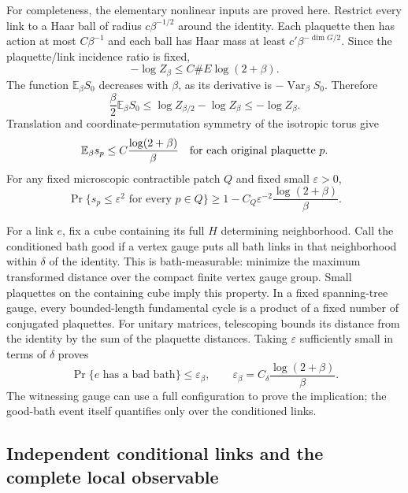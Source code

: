\documentclass[11pt,letterpaper]{article}
\numberwithin{equation}{section}
\theoremstyle{plain}
\theoremstyle{remark}
\DeclareMathOperator{\Var}{Var}
\newcommand{\E}{\mathbb E}
\begin{document}
For completeness, the elementary nonlinear inputs are proved here. Restrict every
link to a Haar ball of radius $c\beta^{-1/2}$ around the identity. Each plaquette
then has action at most $C\beta^{-1}$ and each ball has Haar mass at least
$c'\beta^{-\dim G/2}$. Since the plaquette/link incidence ratio is fixed,
\begin{equation}
 -\log Z_\beta\le C\#E\log(2+\beta).
 \label{eq:partition}
\end{equation}
The function $\E_\beta S_0$ decreases with $\beta$, as its derivative is
$-\Var_\beta S_0$. Therefore
\[
 \frac\beta2\E_\beta S_0
 \le \log Z_{\beta/2}-\log Z_\beta\le-\log Z_\beta.
\]
Translation and coordinate-permutation symmetry of the isotropic torus give
\begin{equation}
 \E_\beta s_p\le C\frac{\log(2+\beta)}{\beta}
 \quad\hbox{for each original plaquette }p.
 \label{eq:plaquette}
\end{equation}
For any fixed microscopic contractible patch $Q$ and fixed small $\varepsilon>0$,
\begin{equation}
 \Pr\{s_p\le\varepsilon^2\text{ for every }p\in Q\}
 \ge1-C_Q\varepsilon^{-2}\frac{\log(2+\beta)}{\beta}.
 \label{eq:localgood}
\end{equation}

For a link $e$, fix a cube containing its full $H$ determining neighborhood.
Call the conditioned bath good if a vertex gauge puts all bath links in that
neighborhood within $\delta$ of the identity. This is bath-measurable: minimize
the maximum transformed distance over the compact finite vertex gauge group.
Small plaquettes on the containing cube imply this property. In a fixed
spanning-tree gauge, every bounded-length fundamental cycle is a product of a
fixed number of conjugated plaquettes. For unitary matrices, telescoping bounds
its distance from the identity by the sum of the plaquette distances. Taking
$\varepsilon$ sufficiently small in terms of $\delta$ proves
\begin{equation}
 \Pr\{e\text{ has a bad bath}\}\le
 \varepsilon_\beta,
 \qquad \varepsilon_\beta=C_\delta\frac{\log(2+\beta)}{\beta}.
 \label{eq:badbath}
\end{equation}
The witnessing gauge can use a full configuration to prove the implication;
the good-bath event itself quantifies only over the conditioned links.

\subsection{Independent conditional links and the complete local observable}
\end{document}
